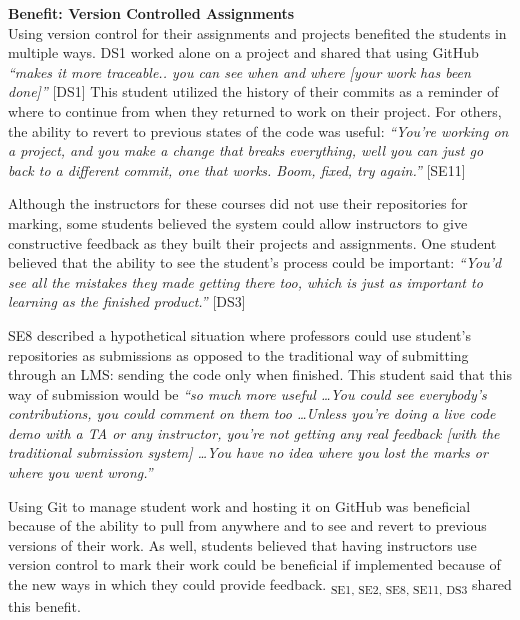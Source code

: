 \textbf{Benefit: Version Controlled Assignments} \\
Using version control for their assignments and projects benefited the students in multiple ways. DS1 worked alone on a project and shared that using GitHub \textit{``makes it more traceable.. you can see when and where [your work has been done]''} [DS1] This student utilized the history of their commits as a reminder of where to continue from when they returned to work on their project. For others, the ability to revert to previous states of the code was useful: \textit{``You're working on a project, and you make a change that breaks everything, well you can just go back to a different commit, one that works. Boom, fixed, try again.''} [SE11]

Although the instructors for these courses did not use their repositories for marking, some students believed the system could allow instructors to give constructive feedback as they built their projects and assignments. One student believed that the ability to see the student's process could be important: \textit{``You'd see all the mistakes they made getting there too, which is just as important to learning as the finished product.''} [DS3]

SE8 described a hypothetical situation where professors could use student's repositories as submissions as opposed to the traditional way of submitting through an LMS: sending the code only when finished. This student said that this way of submission would be \textit{``so much more useful \ldots You could see everybody's contributions, you could comment on them too \ldots Unless you're doing a live code demo with a TA or any instructor, you're not getting any real feedback [with the traditional submission system] \ldots You have no idea where you lost the marks or where you went wrong.''}

Using Git to manage student work and hosting it on GitHub was beneficial because of the ability to pull from anywhere and to see and revert to previous versions of their work. As well, students believed that having instructors use version control to mark their work could be beneficial if implemented because of the new ways in which they could provide feedback. \textsubscript{SE1, SE2, SE8, SE11, DS3} shared this benefit. \\


